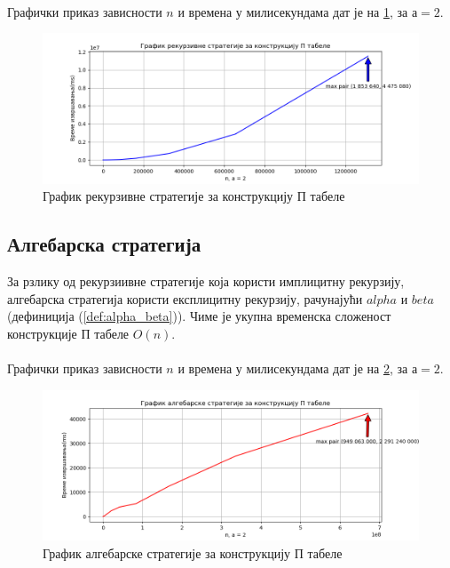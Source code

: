 \documentclass[a4paper]{article}
\begin{document}


\leavevmode\\
Графички приказ зависности $ n $ и времена у милисекундама дат је на \ref{fig:recursive}, за $ а = 2 $.

\begin{figure}[H]
	\caption{График рекурзивне стратегије за конструкцију П табеле}
	\label{fig:recursive}
	\begin{center}
		\includegraphics[width=\textwidth]{recursive.png}
	\end{center}
\end{figure}

\subsection{Алгебарска стратегија}

За рзлику од рекурзиивне стратегије која користи имплицитну рекурзију, алгебарска стратегија користи експлицитну рекурзију, рачунајући $ alpha $ и $ beta $ (дефиниција (\ref{def:alpha_beta})). Чиме је укупна временска сложеност конструкције П табеле $ O(n) $.\\



\leavevmode\\
Графички приказ зависности $ n $ и времена у милисекундама дат је на \ref{fig:algebraic}, за $ а = 2 $.

\begin{figure}[H]
	\caption{График алгебарске стратегије за конструкцију П табеле}
	\label{fig:algebraic}
	\begin{center}
		\includegraphics[width=\textwidth]{algebraic.png}
	\end{center}
\end{figure}
\end{document}
